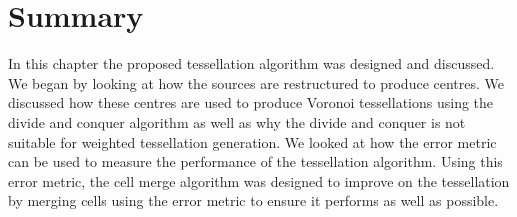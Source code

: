 \section{Summary}
In this chapter the proposed tessellation algorithm was designed and discussed. We began by looking at how the sources are restructured to produce centres. We discussed how these centres are used to produce Voronoi tessellations using the divide and conquer algorithm as well as why the divide and conquer is not suitable for weighted tessellation generation. We looked at how the error metric can be used to measure the performance of the tessellation algorithm. Using this error metric, the cell merge algorithm was designed to improve on the tessellation by merging cells using the error metric to ensure it performs as well as possible.